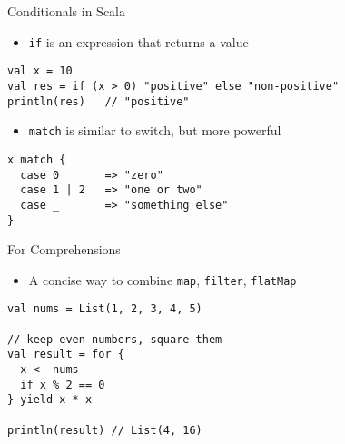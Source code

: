 \begin{frame}[fragile]{Conditionals in Scala}
\begin{itemize}
    \item \texttt{if} is an expression that returns a value
\end{itemize}

\begin{verbatim}
val x = 10
val res = if (x > 0) "positive" else "non-positive"
println(res)   // "positive"
\end{verbatim}

\begin{itemize}
    \item \texttt{match} is similar to switch, but more powerful
\end{itemize}

\begin{verbatim}
x match {
  case 0       => "zero"
  case 1 | 2   => "one or two"
  case _       => "something else"
}
\end{verbatim}
\end{frame}

%
%
%
%

\begin{frame}[fragile]{For Comprehensions}
\begin{itemize}
    \item A concise way to combine \texttt{map}, \texttt{filter}, \texttt{flatMap}
\end{itemize}

\begin{verbatim}
val nums = List(1, 2, 3, 4, 5)

// keep even numbers, square them
val result = for {
  x <- nums
  if x % 2 == 0
} yield x * x

println(result) // List(4, 16)
\end{verbatim}
\end{frame}


